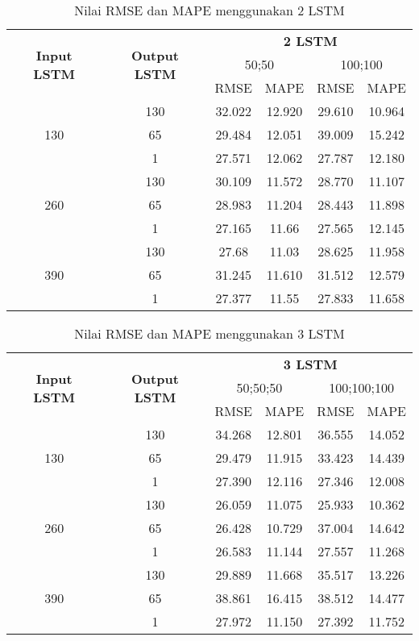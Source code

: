 \documentclass[../thesis.tex]{subfiles}
\begin{document}
\begin{table}[htp]
	\centering
	\begin{tabular}{|c|c|c|c|c|c|}
		\hline 
		\multirow{3}{*}{\textbf{Input LSTM}} & \multirow{3}{*}{\textbf{Output LSTM}} & \multicolumn{4}{c|}{\textbf{2 LSTM}} \\ \cline{3-6}
		&  & \multicolumn{2}{c|}{50;50}& \multicolumn{2}{c|}{100;100} \\ \cline{3-6}
		& & RMSE & MAPE& RMSE & MAPE\\
		\hline
		\multirow{3}{*}{130} & 130 & 32.022 & 12.920 & 29.610 & 10.964 \\
		& 65 & 29.484 & 12.051 & 39.009 & 15.242 \\
		& 1 & 27.571 & 12.062 & 27.787 & 12.180 \\
		\hline
		\multirow{3}{*}{260} & 130 & 30.109 & 11.572 & 28.770 & 11.107 \\
		& 65 & 28.983 & 11.204 & 28.443 & 11.898 \\
		& 1 & 27.165 & 11.66 & 27.565 & 12.145 \\
		\hline
		\multirow{3}{*}{390} & 130 & 27.68 & 11.03 & 28.625 & 11.958 \\
		& 65 & 31.245 & 11.610 & 31.512 & 12.579 \\
		& 1 & 27.377 & 11.55 & 27.833 & 11.658 \\
		\hline
	\end{tabular}
	\caption{Nilai RMSE dan MAPE menggunakan 2 LSTM}
	\label{2LSTM_result}
	\end{table} 

\begin{table}[htp]
	\centering
	\begin{tabular}{|c|c|c|c|c|c|}
		\hline 
		\multirow{3}{*}{\textbf{Input LSTM}} & \multirow{3}{*}{\textbf{Output LSTM}} & \multicolumn{4}{c|}{\textbf{3 LSTM}} \\ \cline{3-6}
		&  & \multicolumn{2}{c|}{50;50;50}& \multicolumn{2}{c|}{100;100;100} \\ \cline{3-6}
		& & RMSE & MAPE& RMSE & MAPE\\
		\hline
		\multirow{3}{*}{130} & 130 & 34.268 & 12.801 & 36.555 & 14.052 \\
		& 65 & 29.479 & 11.915 & 33.423 & 14.439 \\
		& 1 & 27.390 & 12.116 & 27.346 & 12.008 \\
		\hline
		\multirow{3}{*}{260} & 130 & 26.059 & 11.075 & 25.933 & 10.362 \\
		& 65 & 26.428 & 10.729 & 37.004 & 14.642 \\
		& 1 & 26.583 & 11.144 &  27.557 & 11.268 \\
		\hline
		\multirow{3}{*}{390} & 130 & 29.889 & 11.668 & 35.517 & 13.226 \\
		& 65 & 38.861 & 16.415 & 38.512 & 14.477 \\
		& 1 & 27.972 & 11.150 & 27.392 & 11.752 \\
		\hline
	\end{tabular}
	\caption{Nilai RMSE dan MAPE menggunakan 3 LSTM}
	\label{3LSTM_result}
	\end{table} 
\end{document}
